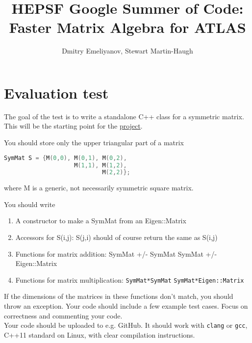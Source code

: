 \documentclass[12pt,a4paper]{article}
\title{HEPSF Google Summer of Code: Faster Matrix Algebra for ATLAS}
\author{Dmitry Emeliyanov, Stewart Martin-Haugh}
\affil{STFC Rutherford Appleton Laboratory}
\begin{document}
\maketitle
\section*{Evaluation test}

The goal of the test is to write a standalone C++ class for a symmetric matrix. This will be the starting point for the \href{http://hepsoftwarefoundation.org/gsoc/2018/proposal\_ATLASEigen.html}{project}.

You should store only the upper triangular part of a matrix

\begin{lstlisting}[language=c++]
SymMat S = {M(0,0), M(0,1), M(0,2),
                    M(1,1), M(1,2),
                            M(2,2)};
\end{lstlisting}

where M is a generic, not necessarily symmetric square matrix.

You should write
\begin{enumerate}
\item A constructor to make a SymMat from an Eigen::Matrix

\item Accessors for S(i,j): S(j,i) should of course return the same as S(i,j)

\item Functions for matrix addition:
\subitem SymMat +/- SymMat
\subitem SymMat +/- Eigen::Matrix

\item Functions for matrix multiplication:
\subitem \lstinline{SymMat*SymMat}
\subitem \lstinline{SymMat*Eigen::Matrix}
\end{enumerate}
If the dimensions of the matrices in these functions don't match, you should throw an exception.
Your code should include a few example test cases. Focus on correctness and commenting your code. \\
 
Your code should be uploaded to e.g. GitHub. It should work with
\lstinline{clang} or \lstinline{gcc}, C++11 standard on Linux, with clear
compilation instructions.
\end{document}
